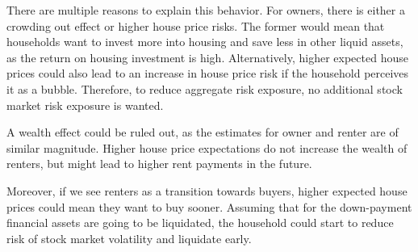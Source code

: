 \documentclass[ProjectABM]{subfiles}
\begin{document}

There are multiple reasons to explain this behavior. For owners, there is either a crowding out effect or higher house price risks. The former would mean that households want to invest more into housing and save less in other liquid assets, as the return on housing investment is high. Alternatively, higher expected house prices could also lead to an increase in house price risk if the household perceives it as a bubble. Therefore, to reduce aggregate risk exposure, no additional stock market risk exposure is wanted.

A wealth effect could be ruled out, as the estimates for owner and renter are of similar magnitude. Higher house price expectations do not increase the wealth of renters, but might lead to higher rent payments in the future. 

Moreover, if we see renters as a transition towards buyers, higher expected house prices could mean they want to buy sooner. Assuming that for the down-payment financial assets are going to be liquidated, the household could start to reduce risk of stock market volatility and liquidate early.



\end{document}
